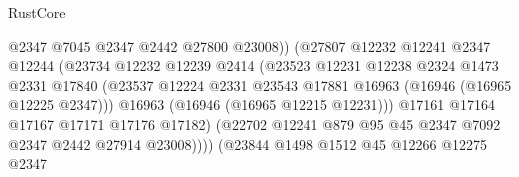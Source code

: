 \begin{lexlean}{RustCore}
\begin{coremodule}
                                        @2347
                                        @7045
                                        @2347
                                        @2442
                                        @27800
                                        @23008))
                                    (@27807
                                      @12232
                                      @12241
                                      @2347
                                      @12244
                                      (@23734
                                        @12232
                                        @12239
                                        @2414
                                        (@23523
                                          @12231
                                          @12238
                                          @2324
                                          @1473
                                          @2331
                                          @17840
                                          (@23537
                                            @12224
                                            @2331
                                            @23543
                                            @17881
                                            @16963
                                            (@16946 (@16965 @12225 @2347)))
                                          @16963
                                          (@16946 (@16965 @12215 @12231)))
                                        @17161
                                        @17164
                                        @17167
                                        @17171
                                        @17176
                                        @17182)
                                      (@22702
                                        @12241
                                        @879
                                        @95
                                        @45
                                        @2347
                                        @7092
                                        @2347
                                        @2442
                                        @27914
                                        @23008))))
                                (@23844
                                  @1498
                                  @1512
                                  @45
                                  @12266
                                  @12275
                                  @2347

\end{coremodule}
\end{lexlean}
